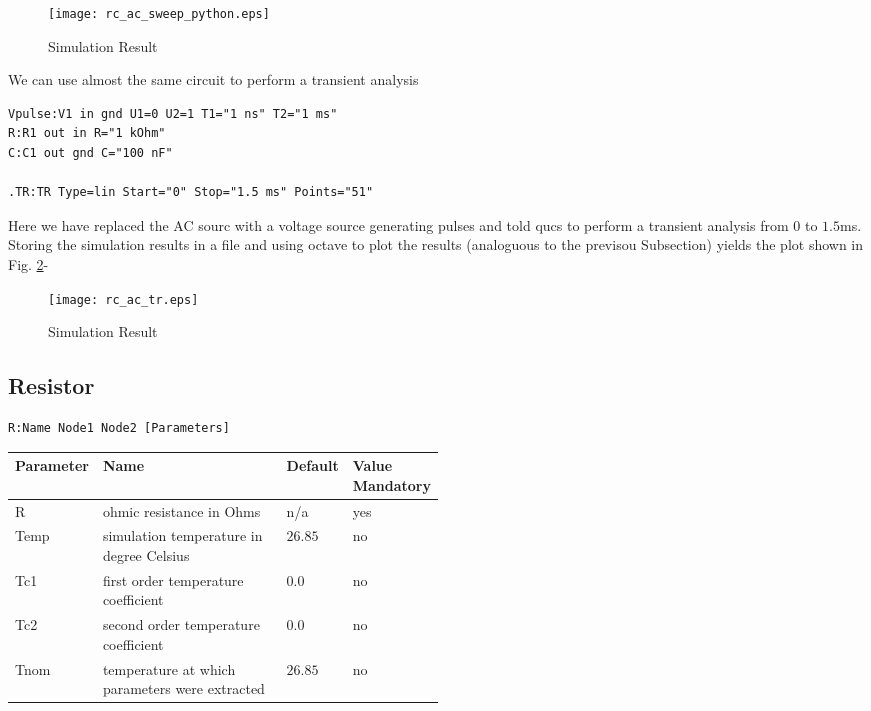 \begin{figure}[h]
\begin{center}
  \texttt{[image: rc\_ac\_sweep\_python.eps]}
  \caption{Simulation Result}
  \label{plot:rc_ac_python}
\end{center}
\end{figure}






We can use almost the same circuit to perform a transient analysis

\begin{verbatim}
Vpulse:V1 in gnd U1=0 U2=1 T1="1 ns" T2="1 ms"
R:R1 out in R="1 kOhm"
C:C1 out gnd C="100 nF"

.TR:TR Type=lin Start="0" Stop="1.5 ms" Points="51"
\end{verbatim}

Here we have replaced the AC sourc with a voltage source generating pulses and told qucs to perform a transient analysis from $0$ to $1.5$ms. Storing the simulation results in a file and using octave to plot the results (analoguous to the previsou Subsection) yields the plot shown in Fig. \ref{plot:rc_ac_tr}-

\begin{figure}[h]
\begin{center}
  \texttt{[image: rc\_ac\_tr.eps]}
  \caption{Simulation Result}
  \label{plot:rc_ac_tr}
\end{center}
\end{figure}



\label{chap:devices}


\subsection{Resistor}

\begin{verbatim}
R:Name Node1 Node2 [Parameters]
\end{verbatim}


\begin{tabular}{|l|p{0.5\linewidth}|l|l|}
\hline
Parameter & Name & Default & Value Mandatory \\
\hline
R & ohmic resistance in Ohms & n/a & yes \\
Temp & simulation temperature in degree Celsius & $26.85$ & no \\
Tc1 & first order temperature coefficient & $0.0$ & no \\
Tc2 & second order temperature coefficient & $0.0$ & no \\
Tnom & temperature at which parameters were extracted & $26.85$ & no \\
\hline
\end{tabular}


